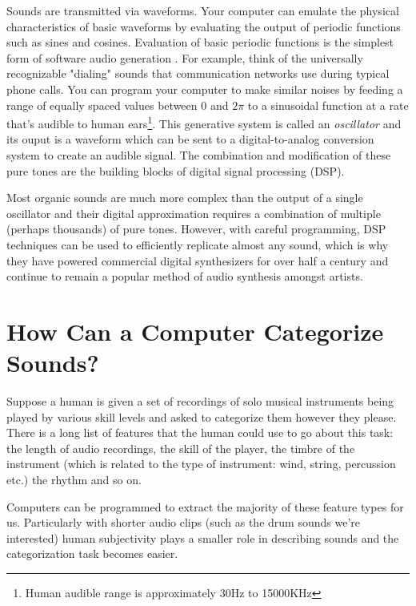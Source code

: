 \documentclass[\main/thesis.tex]{subfiles}
\begin{document}
Sounds are transmitted via waveforms. Your computer can emulate the physical characteristics of basic waveforms by evaluating the output of periodic functions such as sines and cosines. Evaluation of basic periodic functions is the simplest form of software audio generation \cite[chapter~5]{mitchell2009basicsynth}. For example, think of the universally recognizable "dialing" sounds that communication networks use during typical phone calls. You can program your computer to make similar noises by feeding a range of equally spaced values between 0 and $2\pi$ to a sinusoidal function at a rate that's audible to human ears\footnote{Human audible range is approximately 30Hz to 15000KHz}. This generative system is called an \textit{oscillator} and its ouput is a waveform which can be sent to a digital-to-analog conversion system to create an audible signal. The combination and modification of these pure tones are the building blocks of digital signal processing (DSP).


 Most organic sounds are much more complex than the output of a single oscillator and their digital approximation requires a combination of multiple (perhaps thousands) of pure tones. However, with careful programming, DSP techniques can be used to efficiently replicate almost any sound, which is why they have powered commercial digital synthesizers for over half a century \cite{jenkins2019analog} and continue to remain a popular method of audio synthesis amongst artists. 
 

\section{How Can a Computer Categorize Sounds?}
Suppose a human is given a set of recordings of solo musical instruments being played by various skill levels and asked to categorize them however they please. There is a long list of features that the human could use to go about this task: the length of audio recordings, the skill of the player, the timbre of the instrument (which is related to the type of instrument: wind, string, percussion etc.) the rhythm and so on. 

Computers can be programmed to extract the majority of these feature types for us. Particularly with shorter audio clips (such as the drum sounds we're interested) human subjectivity plays a smaller role in describing sounds and the categorization task becomes easier. 
\end{document}
